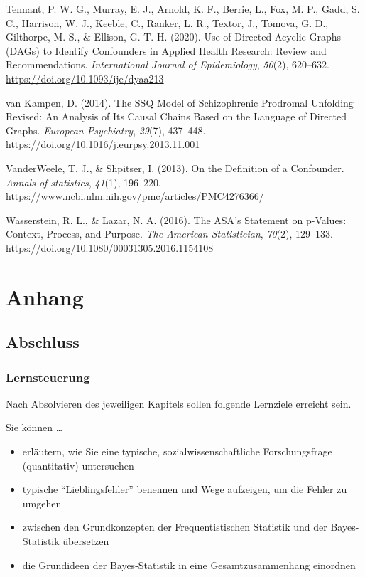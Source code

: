 \documentclass[
  ngerman,
  letterpaper,
  twoside,
  open=any]{scrbook}
\providecommand{\tightlist}{%
  \setlength{\itemsep}{0pt}\setlength{\parskip}{0pt}}\usepackage{longtable,booktabs,array}
\newlength{\cslhangindent}
\newenvironment{CSLReferences}[2] %
 {\begin{list}{}{%
  \setlength{\itemindent}{0pt}
  \setlength{\leftmargin}{0pt}
  \setlength{\parsep}{0pt}
  \ifodd #1
   \setlength{\leftmargin}{\cslhangindent}
   \setlength{\itemindent}{-1\cslhangindent}
  \fi
  \setlength{\itemsep}{#2\baselineskip}}}
 {\end{list}}
\theoremstyle{definition}
\theoremstyle{plain}
\theoremstyle{definition}
\theoremstyle{definition}
\theoremstyle{definition}
\theoremstyle{definition}
\theoremstyle{remark}
\begin{document}
\begin{CSLReferences}{1}{0}
Tennant, P. W. G., Murray, E. J., Arnold, K. F., Berrie, L., Fox, M. P.,
Gadd, S. C., Harrison, W. J., Keeble, C., Ranker, L. R., Textor, J.,
Tomova, G. D., Gilthorpe, M. S., \& Ellison, G. T. H. (2020). Use of
Directed Acyclic Graphs ({DAGs}) to Identify Confounders in Applied
Health Research: Review and Recommendations. \emph{International Journal
of Epidemiology}, \emph{50}(2), 620--632.
\url{https://doi.org/10.1093/ije/dyaa213}

van Kampen, D. (2014). The {SSQ} Model of Schizophrenic Prodromal
Unfolding Revised: {An} Analysis of Its Causal Chains Based on the
Language of Directed Graphs. \emph{European Psychiatry}, \emph{29}(7),
437--448. \url{https://doi.org/10.1016/j.eurpsy.2013.11.001}

VanderWeele, T. J., \& Shpitser, I. (2013). On the Definition of a
Confounder. \emph{Annals of statistics}, \emph{41}(1), 196--220.
\url{https://www.ncbi.nlm.nih.gov/pmc/articles/PMC4276366/}

Wasserstein, R. L., \& Lazar, N. A. (2016). The {ASA}'s {Statement} on
p-{Values}: {Context}, {Process}, and {Purpose}. \emph{The American
Statistician}, \emph{70}(2), 129--133.
\url{https://doi.org/10.1080/00031305.2016.1154108}

\end{CSLReferences}

\part{Anhang}

\chapter{Abschluss}\label{sec-abschluss}

\section{Lernsteuerung}\label{lernsteuerung-13}

Nach Absolvieren des jeweiligen Kapitels sollen folgende Lernziele
erreicht sein.

Sie können \ldots{}

\begin{itemize}
\tightlist
\item
  erläutern, wie Sie eine typische, sozialwissenschaftliche
  Forschungsfrage (quantitativ) untersuchen
\item
  typische ``Lieblingsfehler'' benennen und Wege aufzeigen, um die
  Fehler zu umgehen
\item
  zwischen den Grundkonzepten der Frequentistischen Statistik und der
  Bayes-Statistik übersetzen
\item
  die Grundideen der Bayes-Statistik in eine Gesamtzusammenhang
  einordnen
\end{itemize}
\end{document}
